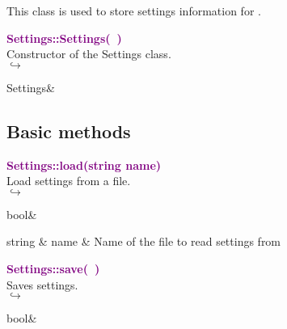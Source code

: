 This class is used to store settings information for \DynELA.



\textcolor{purple}{\textbf{Settings::Settings(~)}}\label{Settings::Settings()}\\
Constructor of the Settings class.\\ \hspace*{5mm}$\hookrightarrow$
\vspace*{-2em}\begin{tcolorbox}[grow to left by=-1cm, width=\textwidth-1cm,myArgs,tabularx={l|R}]
Settings&
\end{tcolorbox}


\subsection{Basic methods}

\textcolor{purple}{\textbf{Settings::load(string name)}}\label{Settings::load(string name)}\\
Load settings from a file.\\ \hspace*{5mm}$\hookrightarrow$
\vspace*{-2em}\begin{tcolorbox}[grow to left by=-1cm, width=\textwidth-1cm,myArgs,tabularx={l|R}]
bool&
\end{tcolorbox}

\begin{tcolorbox}[width=\textwidth,myArgs,tabularx={ll|R}]
string & name & Name of the file to read settings from
\end{tcolorbox}


\textcolor{purple}{\textbf{Settings::save(~)}}\label{Settings::save()}\\
Saves settings.\\ \hspace*{5mm}$\hookrightarrow$
\vspace*{-2em}\begin{tcolorbox}[grow to left by=-1cm, width=\textwidth-1cm,myArgs,tabularx={l|R}]
bool&
\end{tcolorbox}

